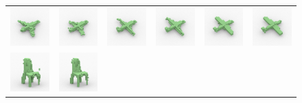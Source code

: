 \begin{figure}[t]
\setlength{\tabcolsep}{0pt}
\begin{tabular}{cccccc}
\includegraphics[width=.166\linewidth]{fig/interpolation/ap0.png} &
\includegraphics[width=.166\linewidth]{fig/interpolation/ap1.png} &
\includegraphics[width=.166\linewidth]{fig/interpolation/ap3.png} &
\includegraphics[width=.166\linewidth]{fig/interpolation/ap4.png} &
\includegraphics[width=.166\linewidth]{fig/interpolation/ap6.png} &
\includegraphics[width=.166\linewidth]{fig/interpolation/ap7.png} \\
\includegraphics[width=.166\linewidth]{fig/interpolation/ch0.png} &
\includegraphics[width=.166\linewidth]{fig/interpolation/ch3.png} &

\end{tabular}
\end{figure}
